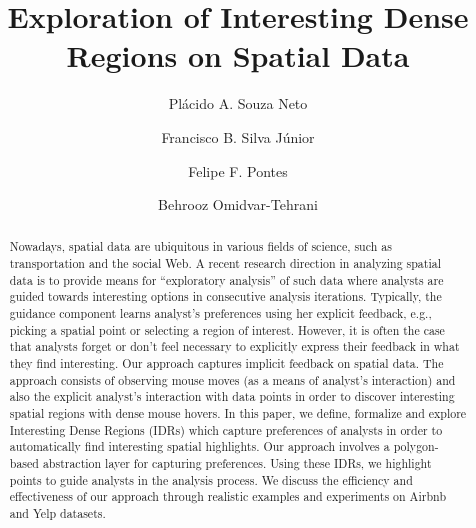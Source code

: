 \documentclass[sigconf,edbt]{acmart-edbt2019}
\begin{document}
\title{Exploration of Interesting Dense Regions on Spatial Data}
  

\author{Pl\'acido A. Souza Neto}

\author{Francisco B. Silva J\'unior}

\author{Felipe F. Pontes}


 \author{Behrooz Omidvar-Tehrani}



\renewcommand{\shortauthors}{}


\begin{abstract}
Nowadays, spatial data are ubiquitous in various fields of science, such as transportation and the social Web. A recent research direction in analyzing spatial data is to provide means for ``exploratory analysis'' of such data where analysts are guided towards interesting options in consecutive analysis iterations. Typically, the guidance component learns analyst's preferences using her explicit feedback, e.g., picking a spatial point or selecting a region of interest. However, it is often the case that analysts forget or don't feel necessary to explicitly express their feedback in what they find interesting. Our approach captures implicit feedback on spatial data. The approach consists of observing mouse moves (as a means of analyst's interaction) and also the explicit analyst's interaction with data points in order to discover interesting spatial regions with dense mouse hovers. In this paper, we define, formalize and explore Interesting Dense Regions (IDRs) which capture preferences of analysts in order to automatically find interesting spatial highlights. Our approach involves a polygon-based abstraction layer for capturing preferences. Using these IDRs, we highlight points to guide analysts in the analysis process. We discuss the efficiency and effectiveness of our approach through realistic examples and experiments on \textsf{Airbnb} and \textsf{Yelp} datasets.
\end{abstract}
\end{document}
